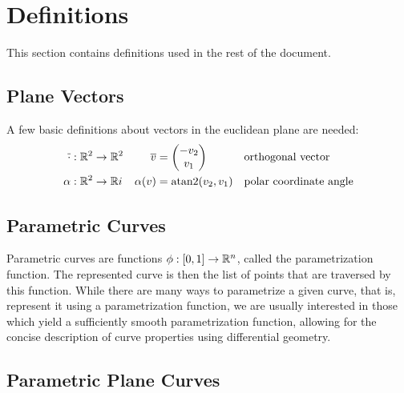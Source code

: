 \documentclass[a4paper]{article}
\begin{document}
	\clearpage

	\appendix

	\section{Definitions}
	\label{section:definitions}

		This section contains definitions used in the rest of the document.

		\subsection{Plane Vectors}
		\label{section:plane_vectors}

			A few basic definitions about vectors in the euclidean plane are needed:
			\begin{align*}
				\overline{\cdot} & : \function{\R{2}}{\R{2}} & \overline{v}      & = \vectorB{-v_2}{v_1}      && \text{orthogonal vector}\\
				\alpha           & : \function{\R{2}}{\RR} i & \apply{\alpha}{v} & = \apply{\atan2}{v_2, v_1} && \text{polar coordinate angle}
			\end{align*}

		\subsection{Parametric Curves}
		\label{section:parametric_curves}

			Parametric curves are functions \(\phi : \left[ 0,1 \right] \rightarrow \mathbb{R}^{n}\), called the parametrization function. The represented curve is then the list of points that are traversed by this function. While there are many ways to parametrize a given curve, that is, represent it using a parametrization function, we are usually interested in those which yield a sufficiently smooth parametrization function, allowing for the concise description of curve properties using differential geometry.

		\subsection{Parametric Plane Curves}
		\label{section:parametric_plane_curves}
\end{document}

